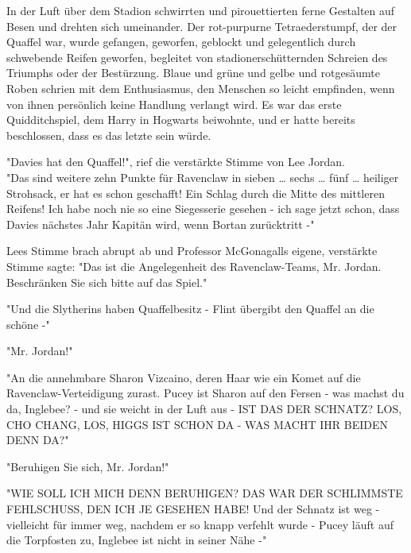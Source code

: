 {In der Luft über dem Stadion schwirrten und pirouettierten ferne Gestalten auf Besen und drehten sich umeinander. Der rot-purpurne Tetraederstumpf, der der Quaffel war, wurde gefangen, geworfen, geblockt und gelegentlich durch schwebende Reifen geworfen, begleitet von stadionerschütternden Schreien des Triumphs oder der Bestürzung. Blaue und grüne und gelbe und rotgesäumte Roben schrien mit dem Enthusiasmus, den Menschen so leicht empfinden, wenn von ihnen persönlich keine Handlung verlangt wird. Es war das erste Quidditchspiel, dem Harry in Hogwarts beiwohnte, und er hatte bereits beschlossen, dass es das letzte sein würde.

"Davies hat den Quaffel!", rief die verstärkte Stimme von Lee Jordan.\\ "Das sind weitere zehn Punkte für Ravenclaw in sieben … sechs … fünf … heiliger Strohsack, er hat es schon geschafft! Ein Schlag durch die Mitte des mittleren Reifens! Ich habe noch nie so eine Siegesserie gesehen - ich sage jetzt schon, dass Davies nächstes Jahr Kapitän wird, wenn Bortan zurücktritt -"

Lees Stimme brach abrupt ab und Professor McGonagalls eigene, verstärkte Stimme sagte: "Das ist die Angelegenheit des Ravenclaw-Teams, Mr. Jordan. Beschränken Sie sich bitte auf das Spiel."

"Und die Slytherins haben Quaffelbesitz - Flint übergibt den Quaffel an die schöne -"

"Mr. Jordan!"

"An die annehmbare Sharon Vizcaino, deren Haar wie ein Komet auf die Ravenclaw-Verteidigung zurast. Pucey ist Sharon auf den Fersen - was machst du da, Inglebee? - und sie weicht in der Luft aus - IST DAS DER SCHNATZ? LOS, CHO CHANG, LOS, HIGGS IST SCHON DA - WAS MACHT IHR BEIDEN DENN DA?"

"Beruhigen Sie sich, Mr. Jordan!"

"WIE SOLL ICH MICH DENN BERUHIGEN? DAS WAR DER SCHLIMMSTE FEHLSCHUSS, DEN ICH JE GESEHEN HABE! Und der Schnatz ist weg - vielleicht für immer weg, nachdem er so knapp verfehlt wurde - Pucey läuft auf die Torpfosten zu, Inglebee ist nicht in seiner Nähe -"

}
